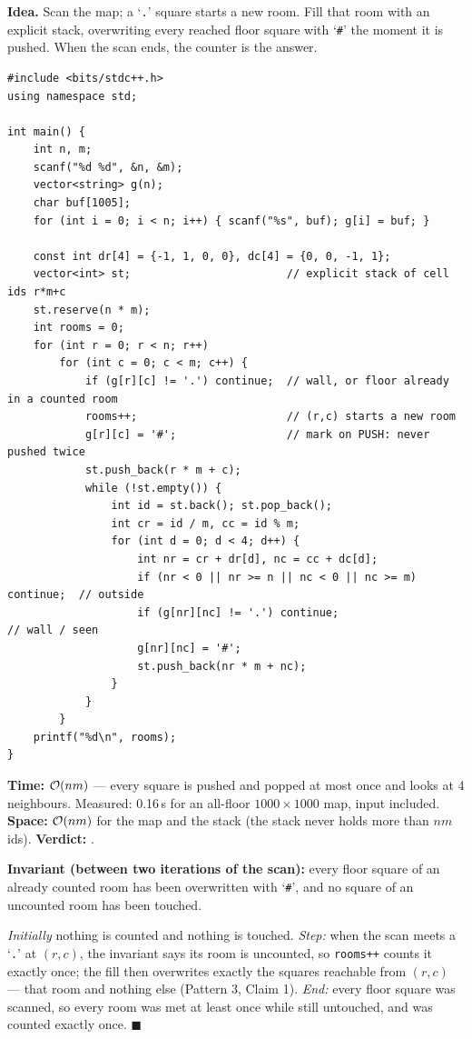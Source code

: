 \begin{algorithmbox}
\textbf{Idea.} Scan the map; a `\texttt{.}' square starts a new room. Fill that room with an explicit stack, overwriting every reached floor square with `\texttt{\#}' the moment it is pushed. When the scan ends, the counter is the answer.

\begin{lstlisting}[style=cpp]
#include <bits/stdc++.h>
using namespace std;

int main() {
    int n, m;
    scanf("%d %d", &n, &m);
    vector<string> g(n);
    char buf[1005];
    for (int i = 0; i < n; i++) { scanf("%s", buf); g[i] = buf; }

    const int dr[4] = {-1, 1, 0, 0}, dc[4] = {0, 0, -1, 1};
    vector<int> st;                        // explicit stack of cell ids r*m+c
    st.reserve(n * m);
    int rooms = 0;
    for (int r = 0; r < n; r++)
        for (int c = 0; c < m; c++) {
            if (g[r][c] != '.') continue;  // wall, or floor already in a counted room
            rooms++;                       // (r,c) starts a new room
            g[r][c] = '#';                 // mark on PUSH: never pushed twice
            st.push_back(r * m + c);
            while (!st.empty()) {
                int id = st.back(); st.pop_back();
                int cr = id / m, cc = id % m;
                for (int d = 0; d < 4; d++) {
                    int nr = cr + dr[d], nc = cc + dc[d];
                    if (nr < 0 || nr >= n || nc < 0 || nc >= m) continue;  // outside
                    if (g[nr][nc] != '.') continue;                       // wall / seen
                    g[nr][nc] = '#';
                    st.push_back(nr * m + nc);
                }
            }
        }
    printf("%d\n", rooms);
}
\end{lstlisting}

\begin{complexitybox}
\textbf{Time:} $\mathcal{O}(nm)$ --- every square is pushed and popped at most once and looks at 4 neighbours. Measured: 0.16\,s for an all-floor $1000\times1000$ map, input included. \textbf{Space:} $\mathcal{O}(nm)$ for the map and the stack (the stack never holds more than $nm$ ids). \textbf{Verdict:} \ac{}.
\end{complexitybox}
\end{algorithmbox}

\begin{invariantbox}
\textbf{Invariant (between two iterations of the scan):} every floor square of an already counted room has been overwritten with `\texttt{\#}', and no square of an uncounted room has been touched.

\emph{Initially} nothing is counted and nothing is touched. \emph{Step:} when the scan meets a `\texttt{.}' at $(r,c)$, the invariant says its room is uncounted, so \texttt{rooms++} counts it exactly once; the fill then overwrites exactly the squares reachable from $(r,c)$ --- that room and nothing else (Pattern 3, Claim 1). \emph{End:} every floor square was scanned, so every room was met at least once while still untouched, and was counted exactly once. \hfill$\blacksquare$
\end{invariantbox}

